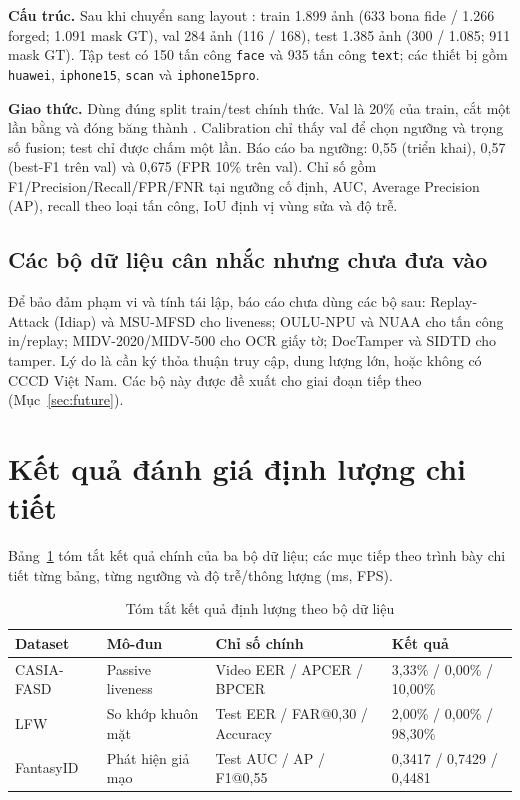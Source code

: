 \documentclass[12pt,a4paper]{article}
\begin{document}
\textbf{Cấu trúc.} Sau khi chuyển sang layout :
train 1.899 ảnh (633 bona fide / 1.266 forged; 1.091 mask GT), val 284 ảnh (116 / 168), test 1.385 ảnh
(300 / 1.085; 911 mask GT). Tập test có 150 tấn công \texttt{face} và 935 tấn công \texttt{text};
các thiết bị gồm \texttt{huawei}, \texttt{iphone15}, \texttt{scan} và \texttt{iphone15pro}.

\textbf{Giao thức.} Dùng đúng split train/test chính thức. Val là 20\% của train, cắt một lần bằng
 và đóng băng thành .
Calibration chỉ thấy val để chọn ngưỡng và trọng số fusion; test chỉ được chấm một lần. Báo cáo ba
ngưỡng: 0,55 (triển khai), 0,57 (best-F1 trên val) và 0,675 (FPR 10\% trên val). Chỉ số gồm
F1/Precision/Recall/FPR/FNR tại ngưỡng cố định, AUC, Average Precision (AP), recall theo loại tấn công,
IoU định vị vùng sửa và độ trễ.

\subsection{Các bộ dữ liệu cân nhắc nhưng chưa đưa vào}
Để bảo đảm phạm vi và tính tái lập, báo cáo chưa dùng các bộ sau: Replay-Attack (Idiap) và MSU-MFSD
cho liveness; OULU-NPU và NUAA cho tấn công in/replay; MIDV-2020/MIDV-500 cho OCR giấy tờ;
DocTamper và SIDTD cho tamper. Lý do là cần ký thỏa thuận truy cập, dung lượng lớn, hoặc không có
CCCD Việt Nam. Các bộ này được đề xuất cho giai đoạn tiếp theo (Mục~\ref{sec:future}).

\section{Kết quả đánh giá định lượng chi tiết}\label{sec:quant}
Bảng~\ref{tab:quant-summary} tóm tắt kết quả chính của ba bộ dữ liệu; các mục tiếp theo trình bày
chi tiết từng bảng, từng ngưỡng và độ trễ/thông lượng (ms, FPS).

\begin{table}[H]
  \centering
  \caption{Tóm tắt kết quả định lượng theo bộ dữ liệu}
  \label{tab:quant-summary}
  \small
  \begin{tabular}{@{}p{2.4cm}p{2.5cm}p{4.2cm}p{4.2cm}@{}}
    \toprule
    \textbf{Dataset} & \textbf{Mô-đun} & \textbf{Chỉ số chính} & \textbf{Kết quả}\\
    \midrule
    CASIA-FASD & Passive liveness & Video EER / APCER / BPCER & 3,33\% / 0,00\% / 10,00\%\\
    LFW & So khớp khuôn mặt & Test EER / FAR@0,30 / Accuracy & 2,00\% / 0,00\% / 98,30\%\\
    FantasyID & Phát hiện giả mạo & Test AUC / AP / F1@0,55 & 0,3417 / 0,7429 / 0,4481\\
    \bottomrule
  \end{tabular}
\end{table}
\end{document}
